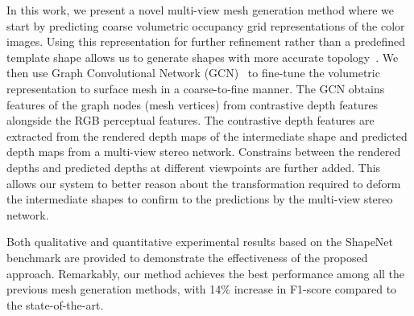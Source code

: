 

In this work, we present a novel multi-view mesh generation method where we start by predicting coarse volumetric occupancy grid representations of the color images.
Using this representation for further refinement rather than a predefined template shape allows us to generate shapes with more accurate topology~\cite{gkioxari2019meshrcnn}.
We then use Graph Convolutional Network (GCN)~\cite{scarselli2008graph,wang2018pixel2mesh} to fine-tune the volumetric representation to surface mesh in a coarse-to-fine manner.
The GCN obtains features of the graph nodes (mesh vertices) from contrastive depth features alongside the RGB perceptual features.
The contrastive depth features are extracted from the rendered depth maps of the intermediate shape and predicted depth maps from a multi-view stereo network.
Constrains between the rendered depths and predicted depths at different viewpoints are further added.
This allows our system to better reason about the transformation required to deform the intermediate shapes to confirm to the predictions by the multi-view stereo network.

Both qualitative and quantitative experimental results based on the ShapeNet~\cite{chang2015shapenet} benchmark are provided to demonstrate the effectiveness of the proposed approach. Remarkably, our method achieves the best performance among all the previous mesh generation methods, with 14\% increase in F1-score compared to the state-of-the-art.

